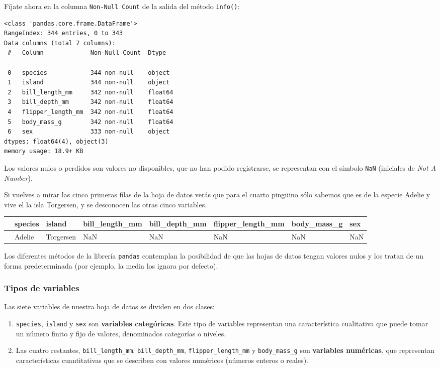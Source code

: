 \documentclass[
  a4paper,
  noprof,
  12pt,
  notoc,
  nosols,
  nobib]{mnye}
\theoremstyle{definition}
\theoremstyle{remark}
\begin{document}
Fíjate ahora en la columna \texttt{Non-Null\ Count} de la salida del
método \texttt{info()}:

\begin{verbatim}
<class 'pandas.core.frame.DataFrame'>
RangeIndex: 344 entries, 0 to 343
Data columns (total 7 columns):
 #   Column             Non-Null Count  Dtype  
---  ------             --------------  -----  
 0   species            344 non-null    object 
 1   island             344 non-null    object 
 2   bill_length_mm     342 non-null    float64
 3   bill_depth_mm      342 non-null    float64
 4   flipper_length_mm  342 non-null    float64
 5   body_mass_g        342 non-null    float64
 6   sex                333 non-null    object 
dtypes: float64(4), object(3)
memory usage: 18.9+ KB
\end{verbatim}

Los valores nulos o perdidos son valores no disponibles, que no han
podido registrarse, se representan con el símbolo \texttt{NaN}
(iniciales de \emph{Not A Number}).

Si vuelves a mirar las cinco primeras filas de la hoja de datos verás
que para el cuarto pingüino sólo sabemos que es de la especie Adelie y
vive el la isla Torgersen, y se desconocen las otras cinco variables.

\begin{longtable}[]{@{}llllllll@{}}
\toprule\noalign{}
& species & island & bill\_length\_mm & bill\_depth\_mm &
flipper\_length\_mm & body\_mass\_g & sex \\
\midrule\noalign{}
\endhead
\bottomrule\noalign{}
\endlastfoot
3 & Adelie & Torgersen & NaN & NaN & NaN & NaN & NaN \\
\end{longtable}

Los diferentes métodos de la librería \texttt{pandas} contemplan la
posibilidad de que las hojas de datos tengan valores nulos y los tratan
de un forma predeterminada (por ejemplo, la media los ignora por
defecto).

\subsubsection{Tipos de variables}\label{tipos-de-variables}

Las siete variables de nuestra hoja de datos se dividen en dos clases:

\begin{enumerate}
\def\labelenumi{\arabic{enumi}.}
\item
  \texttt{species}, \texttt{island} y \texttt{sex} son \textbf{variables
  categóricas}. Este tipo de variables representan una característica
  cualitativa que puede tomar un número finito y fijo de valores,
  denominados categorías o niveles.
\item
  Las cuatro restantes, \texttt{bill\_length\_mm},
  \texttt{bill\_depth\_mm}, \texttt{flipper\_length\_mm} y
  \texttt{body\_mass\_g} son \textbf{variables numéricas}, que
  representan características cuantitativas que se describen con valores
  numéricos (números enteros o reales).
\end{enumerate}
\end{document}
